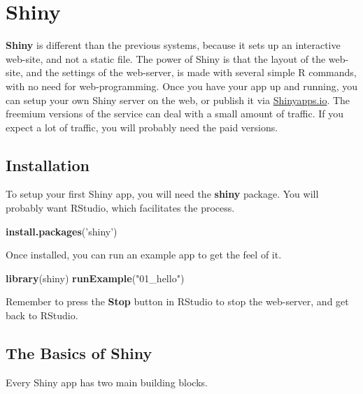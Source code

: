 \documentclass[]{book}
\newenvironment{Shaded}{\begin{snugshade}}{\end{snugshade}}
\newcommand{\KeywordTok}[1]{\textcolor[rgb]{0.13,0.29,0.53}{\textbf{#1}}}
\newcommand{\StringTok}[1]{\textcolor[rgb]{0.31,0.60,0.02}{#1}}
\newcommand{\NormalTok}[1]{#1}
\theoremstyle{definition}
\theoremstyle{definition}
\theoremstyle{definition}
\theoremstyle{remark}
\begin{document}
\section{Shiny}\label{shiny}

\textbf{Shiny} \citep{shiny} is different than the previous systems,
because it sets up an interactive web-site, and not a static file. The
power of Shiny is that the layout of the web-site, and the settings of
the web-server, is made with several simple R commands, with no need for
web-programming. Once you have your app up and running, you can setup
your own Shiny server on the web, or publish it via
\href{https://www.shinyapps.io/}{Shinyapps.io}. The freemium versions of
the service can deal with a small amount of traffic. If you expect a lot
of traffic, you will probably need the paid versions.

\subsection{Installation}\label{installation-1}

To setup your first Shiny app, you will need the \textbf{shiny} package.
You will probably want RStudio, which facilitates the process.

\begin{Shaded}
\begin{Highlighting}[]
\KeywordTok{install.packages}\NormalTok{(}\StringTok{'shiny'}\NormalTok{)}
\end{Highlighting}
\end{Shaded}

Once installed, you can run an example app to get the feel of it.

\begin{Shaded}
\begin{Highlighting}[]
\KeywordTok{library}\NormalTok{(shiny)}
\KeywordTok{runExample}\NormalTok{(}\StringTok{"01_hello"}\NormalTok{)}
\end{Highlighting}
\end{Shaded}

Remember to press the \textbf{Stop} button in RStudio to stop the
web-server, and get back to RStudio.

\subsection{The Basics of Shiny}\label{the-basics-of-shiny}

Every Shiny app has two main building blocks.
\end{document}
